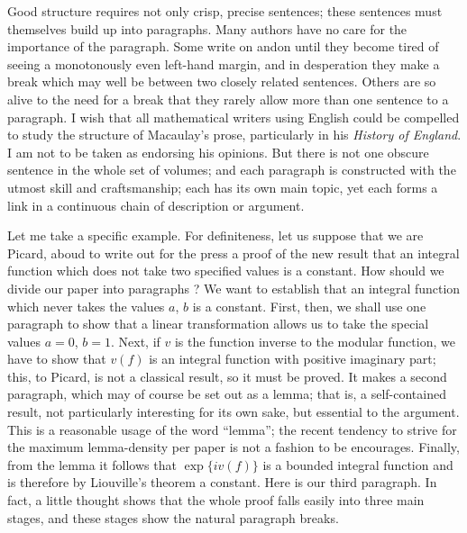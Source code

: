 Good structure requires not only crisp, precise sentences; these sentences must themselves build up into paragraphs. Many authors have no care for the importance of the paragraph. Some write on and\pageoriginale on until they become tired of seeing a monotonously even left-hand margin, and in desperation they make a break which may well be between two closely related sentences. Others are so alive to the need for a break that they rarely allow more than one sentence to a paragraph. I wish that all mathematical writers using English could be compelled to study the structure of Macaulay's prose, particularly in his {\em History of England}. I am not to be taken as endorsing his opinions. But there is not one obscure sentence in the whole set of volumes; and each paragraph is constructed with the utmost skill and craftsmanship; each has its own main topic, yet each forms a link in a continuous chain of description or argument.

Let me take a specific example. For definiteness, let us suppose that we are Picard, aboud to write out for the press a proof of the new result that an integral function which does not take two specified values is a constant. How should we divide our paper into paragraphs ? We want to establish that an integral function which never takes the values $a$, $b$ is a constant. First, then, we shall use one paragraph to show that a linear transformation allows us to take the special values $a=0$, $b=1$. Next, if $v$ is the function inverse to the modular function, we have to show that $v(f)$ is an integral function with positive imaginary part; this, to Picard, is not a classical result, so it must be proved. It makes a second paragraph, which may of course be set out as a lemma; that is, a self-contained result, not particularly interesting for its own sake, but essential to the argument. This is a reasonable usage of the word ``lemma''; the recent tendency to strive for the maximum lemma-density per paper is not a fashion to be encourages. Finally, from the lemma it follows that $\exp \{iv (f)\}$ is a bounded integral function and is therefore by Liouville's theorem a constant. Here is our third paragraph. In fact, a little thought shows that the whole proof falls easily into three main stages, and these stages show the natural paragraph breaks.

